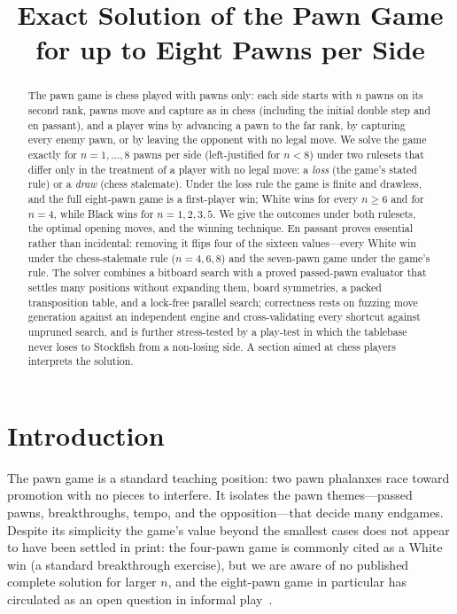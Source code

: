 \documentclass[11pt]{article}
\title{Exact Solution of the Pawn Game for up to Eight Pawns per Side}
\author{}
\date{}
\theoremstyle{plain}
\theoremstyle{definition}
\begin{document}
\maketitle

\begin{abstract}
The pawn game is chess played with pawns only: each side starts with $n$ pawns
on its second rank, pawns move and capture as in chess (including the initial
double step and en passant), and a player wins by advancing a pawn to the far
rank, by capturing every enemy pawn, or by leaving the opponent with no legal
move. We solve the game exactly for $n=1,\dots,8$ pawns per side (left-justified
for $n<8$) under two rulesets that differ only in the treatment of a player with
no legal move: a \emph{loss} (the game's stated rule) or a \emph{draw} (chess
stalemate). Under the loss rule the game is finite and drawless, and the full
eight-pawn game is a first-player win; White wins for every $n\ge 6$ and for
$n=4$, while Black wins for $n=1,2,3,5$. We give the outcomes under both rulesets,
the optimal opening moves, and the winning technique. En passant proves essential
rather than incidental: removing it flips four of the sixteen values---every White
win under the chess-stalemate rule ($n=4,6,8$) and the seven-pawn game under the
game's rule. The solver combines a
bitboard search with a proved passed-pawn evaluator that settles many positions
without expanding them, board symmetries, a packed transposition table, and a
lock-free parallel search; correctness rests on fuzzing move generation against an
independent engine and cross-validating every shortcut against unpruned search, and
is further stress-tested by a play-test in which the tablebase never loses to
Stockfish from a non-losing side. A section aimed at chess players interprets the
solution.
\end{abstract}

\section{Introduction}

The pawn game is a standard teaching position: two pawn phalanxes race toward
promotion with no pieces to interfere. It isolates the pawn themes---passed
pawns, breakthroughs, tempo, and the opposition---that decide many endgames.
Despite its simplicity the game's value beyond the smallest cases does not appear
to have been settled in print: the four-pawn game is commonly cited as a White win
(a standard breakthrough exercise), but we are aware of no published complete
solution for larger $n$, and the eight-pawn game in particular has circulated as an
open question in informal play~\cite{pawngame}.
\end{document}
